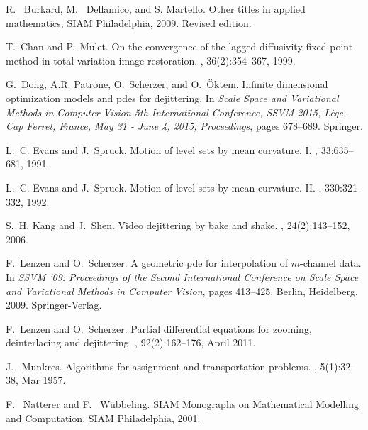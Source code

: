 \documentclass[runningheads,a4paper]{llncs}\usepackage{latexsym}
\begin{document}
\bigskip
\begin{thebibliography}{10}
R. ~Burkard, M. ~Dellamico, and S. Martello.
\newblock Other titles in applied mathematics,
\newblock SIAM Philadelphia, 2009. Revised edition.

T.~Chan and P.~Mulet.
\newblock On the convergence of the lagged diffusivity fixed point method in
  total variation image restoration.
, 36(2):354--367, 1999.

G.~Dong, A.R. Patrone, O.~Scherzer, and O.~{\"O}ktem.
\newblock Infinite dimensional optimization models and pdes for dejittering.
\newblock In {\em Scale Space and Variational Methods in Computer Vision 5th
  International Conference, SSVM 2015, L{\`e}ge-Cap Ferret, France, May 31 -
  June 4, 2015, Proceedings}, pages 678--689. Springer.

L.~C. Evans and J.~Spruck.
\newblock Motion of level sets by mean curvature. {I}.
, 33:635--681, 1991.

L.~C. Evans and J.~Spruck.
\newblock Motion of level sets by mean curvature. {II}.
, 330:321--332, 1992.

S.~H. Kang and J.~Shen.
\newblock Video dejittering by bake and shake.
, 24(2):143--152, 2006.

F.~Lenzen and O.~Scherzer.
\newblock A geometric pde for interpolation of $m$-channel data.
\newblock In {\em SSVM '09: Proceedings of the Second International Conference
  on Scale Space and Variational Methods in Computer Vision}, pages 413--425,
  Berlin, Heidelberg, 2009. Springer-Verlag.

F.~Lenzen and O.~Scherzer.
\newblock Partial differential equations for zooming, deinterlacing and
  dejittering.
, 92(2):162--176, April 2011.

J. ~Munkres.
\newblock Algorithms for assignment and transportation problems.
, 5(1):32--38, Mar 1957.

F. ~Natterer and F. ~W\"ubbeling.
\newblock SIAM Monographs on Mathematical Modelling and Computation,
\newblock SIAM Philadelphia, 2001.


\end{thebibliography}
\end{document}
